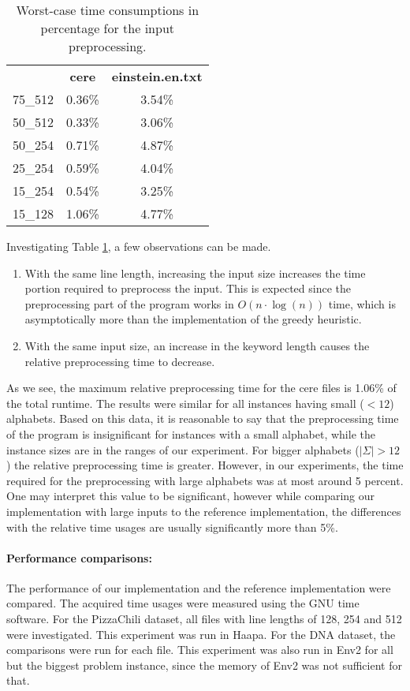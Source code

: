 \documentclass[english,twoside,censored,csm,algorithms-track-2020]{HYthesisML}
\theoremstyle{plain}
\theoremstyle{definition}
\begin{document}
\begin{table}
\begin{centering}
\begin{tabular}{l | c c}
  & \textbf{cere} & \textbf{einstein.en.txt} \\
  75\_512 & 0.36\% & 3.54\% \\
  50\_512 & 0.33\% & 3.06\% \\
  50\_254 & 0.71\% & 4.87\% \\
  25\_254 & 0.59\% & 4.04\% \\
  15\_254 & 0.54\% & 3.25\% \\
  15\_128 & 1.06\% & 4.77\% \\
\end{tabular}
  \caption{Worst-case time consumptions in percentage for the input preprocessing.}
  \label{table-duplicate-time}
\end{centering}
\end{table}
Investigating Table \ref{table-duplicate-time}, a few observations can be made.

\begin{enumerate}
\item With the same line length, increasing the input size increases the time portion required to preprocess the input. This is expected since the preprocessing part of the program works in $O(n\cdot\log(n))$ time, which is asymptotically more than the implementation of the greedy heuristic.
\item With the same input size, an increase in the keyword length causes the relative preprocessing time to decrease. 
\end{enumerate}

As we see, the maximum relative preprocessing time for the cere files is 1.06\% of the total runtime.
The results were similar for all instances having small ($<12$) alphabets. Based on this data,
it is reasonable to say that the preprocessing time of the program is insignificant for instances
with a small alphabet, while the instance sizes are in the ranges of our experiment. For bigger
alphabets ($|\Sigma|>12$) the relative preprocessing time is greater. However, in our experiments,
the time required for the preprocessing with large alphabets was at most around 5 percent. One may
interpret this value to be significant, however while comparing our implementation with large
inputs to the reference implementation, the differences with the relative time usages are usually
significantly more than 5\%.


\paragraph{Performance comparisons:}
The performance of our implementation and the reference implementation were compared. The acquired
time usages were measured using the GNU time software. For the PizzaChili dataset, all files with line
lengths of 128, 254 and 512 were investigated. This experiment was run in Haapa. For the DNA dataset,
the comparisons were run for each file. This experiment was also run in Env2 for all but the
biggest problem instance, since the memory of Env2 was not sufficient for that.
\end{document}
